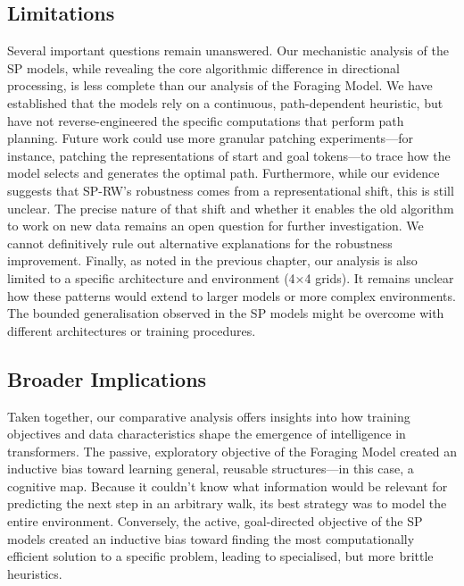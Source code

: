 \subsection{Limitations}
Several important questions remain unanswered. Our mechanistic analysis of the SP models, while revealing the core algorithmic difference in directional processing, is less complete than our analysis of the Foraging Model. We have established that the models rely on a continuous, path-dependent heuristic, but have not reverse-engineered the specific computations that perform path planning. Future work could use more granular patching experiments—for instance, patching the representations of start and goal tokens—to trace how the model selects and generates the optimal path. Furthermore, while our evidence suggests that SP-RW's robustness comes from a representational shift, this is still unclear. The precise nature of that shift and whether it enables the old algorithm to work on new data remains an open question for further investigation. We cannot definitively rule out alternative explanations for the robustness improvement. Finally, as noted in the previous chapter, our analysis is also limited to a specific architecture and environment (4×4 grids). It remains unclear how these patterns would extend to larger models or more complex environments. The bounded generalisation observed in the SP models might be overcome with different architectures or training procedures.

\subsection{Broader Implications}
Taken together, our comparative analysis offers insights into how training objectives and data characteristics shape the emergence of intelligence in transformers. The passive, exploratory objective of the Foraging Model created an inductive bias toward learning general, reusable structures—in this case, a cognitive map. Because it couldn't know what information would be relevant for predicting the next step in an arbitrary walk, its best strategy was to model the entire environment. Conversely, the active, goal-directed objective of the SP models created an inductive bias toward finding the most computationally efficient solution to a specific problem, leading to specialised, but more brittle heuristics. %


